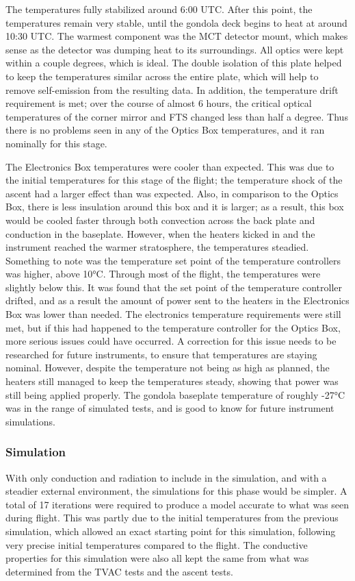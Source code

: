 The temperatures fully stabilized around 6:00 UTC. After this point, the temperatures remain very stable, until the gondola deck begins to heat at around 10:30 UTC. The warmest component was the MCT detector mount, which makes sense as the detector was dumping heat to its surroundings. All optics were kept within a couple degrees, which is ideal. The double isolation of this plate helped to keep the temperatures similar across the entire plate, which will help to remove self-emission from the resulting data. In addition, the temperature drift requirement is met; over the course of almost 6 hours, the critical optical temperatures of the corner mirror and FTS changed less than half a degree. Thus there is no problems seen in any of the Optics Box temperatures, and it ran nominally for this stage.

The Electronics Box temperatures were cooler than expected. This was due to the initial temperatures for this stage of the flight; the temperature shock of the ascent had a larger effect than was expected. Also, in comparison to the Optics Box, there is less insulation around this box and it is larger; as a result, this box would be cooled faster through both convection across the back plate and conduction in the baseplate. However, when the heaters kicked in and the instrument reached the warmer stratosphere, the temperatures steadied. Something to note was the temperature set point of the temperature controllers was higher, above 10°C. Through most of the flight, the temperatures were slightly below this. It was found that the set point of the temperature controller drifted, and as a result the amount of power sent to the heaters in the Electronics Box was lower than needed. The electronics temperature requirements were still met, but if this had happened to the temperature controller for the Optics Box, more serious issues could have occurred. A correction for this issue needs to be researched for future instruments, to ensure that temperatures are staying nominal. However, despite the temperature not being as high as planned, the heaters still managed to keep the temperatures steady, showing that power was still being applied properly. The gondola baseplate temperature of roughly -27°C was in the range of simulated tests, and is good to know for future instrument simulations.

\subsubsection{Simulation}
With only conduction and radiation to include in the simulation, and with a steadier external environment, the simulations for this phase would be simpler. A total of 17 iterations were required to produce a model accurate to what was seen during flight. This was partly due to the initial temperatures from the previous simulation, which allowed an exact starting point for this simulation, following very precise initial temperatures compared to the flight. The conductive properties for this simulation were also all kept the same from what was determined from the TVAC tests and the ascent tests.

